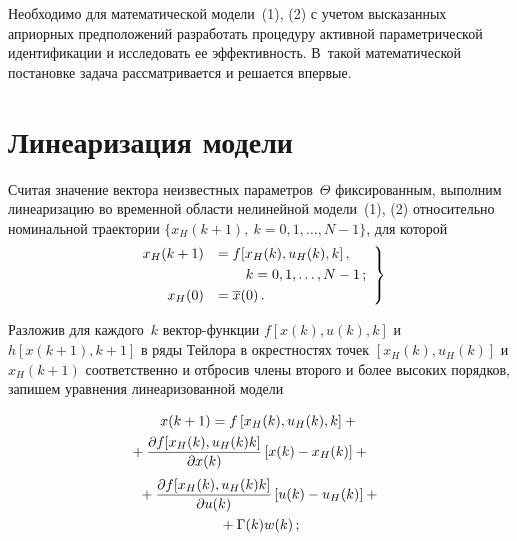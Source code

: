 \begin{multicols}{2}
  Необходимо для математической модели~(1), (2) с учетом высказанных
априорных предположений разработать процедуру активной параметрической
идентификации и исследовать ее эффективность. В~такой математической
постановке задача рассматривается и решается впервые.

\vspace*{-4pt}

\section{Линеаризация модели}

\vspace*{-2pt}

  Считая значение вектора неизвестных параметров~$\Theta$ фиксированным,
выполним линеаризацию во временной области нелинейной модели~(1), (2)
относительно номинальной траектории $\{x_H(k+1),\ k=0, 1, \ldots , N-1\}$, для
которой
  \begin{equation}
  \left.
  \begin{array}{rl}
  x_H(k+1) & =f[x_H(k), u_H(k),k]\,,\\[3pt]
  &\hspace*{7mm} k=0,1, \ldots , N-1\,;\\[3pt]
  x_H(0) & =\overline{x}(0)\,.
  \end{array}
  \right \}
  \label{e3-c}
  \end{equation}

  Разложив для каждого~$k$ век\-тор-функ\-ции $f[x(k), u(k), k]$ и $h[x(k+1),
k+1]$ в ряды Тейлора в окрестностях точек $[x_H(k), u_H(k)]$ и $x_H(k+1)$
соответственно и отбросив члены второго и более высоких порядков, запишем
уравнения линеаризованной модели

\noindent
  \begin{multline*}
  x(k+1)=f\left[x_H(k),u_H(k),k\right]+{}\\
  {}+\displaystyle\frac{\displaystyle \partial f[x_H(k),u_H(k)k]\mathstrut}{\displaystyle \partial
x(k)\mathstrut}\left[x(k)-x_H(k)\right]+{}\hspace*{5mm}
\end{multline*}
  \begin{multline}
  {}+\displaystyle\frac{\displaystyle \partial f[x_H(k),u_H(k)k]\mathstrut}{\displaystyle \partial u(k)\mathstrut}\left[ u(k)-
u_H(k)\right]+{}\\
{}+\Gamma(k) w(k)\,;
\label{e4-c}
  \end{multline}
  
  \vspace*{-12pt}


\end{multicols}

